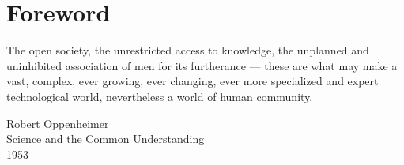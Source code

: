 \chapter*{Foreword}

\epigraph{
The open society, the unrestricted access to knowledge, the unplanned and
uninhibited association of men for its furtherance — these are what may
make a vast, complex, ever growing, ever changing, ever more specialized
and expert technological world, nevertheless a world of human community.
}{Robert Oppenheimer\\Science and the Common Understanding\\1953}
